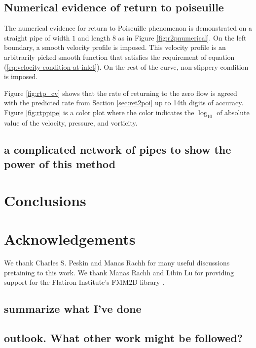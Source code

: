 \documentclass[10pt,twocolumn]{article}
\begin{document}
\subsection{Numerical evidence of return to poiseuille}


The numerical evidence for return to Poiseuille phenomenon is 
demonstrated on a straight pipe of width $1$ and length $8$ as in Figure \ref{fig:r2pnumerical}. 
On the left boundary, a smooth velocity profile is imposed. 
This velocity profile is an arbitrarily picked smooth function that satisfies 
the requirement of equation (\ref{eq:velocity-condition-at-inlet}). 
On the rest of the curve, non-slippery condition is imposed.

Figure \ref{fig:rtp_cv} shows that the rate of returning 
to the zero flow is agreed with the 
predicted rate from Section \ref{sec:ret2poi} up to 14th digits of accuracy. 
Figure \ref{fig:rtppipe} is a color
plot where the color indicates the $\log_{10}$ of absolute value of the velocity, 
pressure, and vorticity. 




\subsection{a complicated network of pipes to show the power of this method}



\section{Conclusions\label{sec:conclusions}}


\section{Acknowledgements\label{sec:acknowledgements}}

We thank Charles S. Peskin and Manas Rachh for many useful discussions pretaining to this work.
We thank Manas Rachh and Libin Lu for providing support for the Flatiron Institute's FMM2D library \cite{FlatironinstituteFmm2d2022}.



\subsection{summarize what I've done}
\subsection{outlook. What other work might be followed?}


\end{document}
